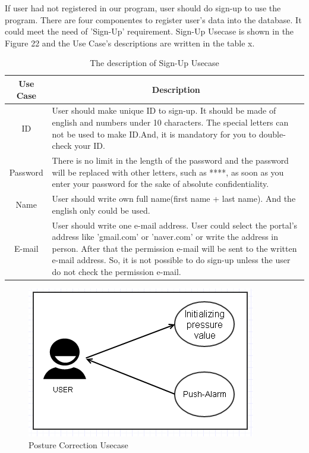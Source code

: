 \documentclass[conference]{IEEEtran}
\begin{document}
 
If user had not registered in our program, user should do sign-up to use the program. There are four componentes to register user's data into the database. It could meet the need of 'Sign-Up' requirement. Sign-Up Usecase is shown in the Figure 22 and the Use Case's descriptions are written in the table x.

\begin{table}[h]
{\renewcommand\arraystretch{1.25}
\caption{The description of Sign-Up Usecase}
\begin{tabular}{|c|l|l|} \hline
Use Case & \multicolumn{2}{c|}{Description} \\ \hline\hline
ID& \multicolumn{2}{p{6.75cm}|}{\raggedright User should make unique ID to sign-up. It should be made of english and numbers under 10 characters. The special letters can not be used to make ID.And, it is mandatory for you to double-check your ID.} \\ \hline
Password & \multicolumn{2}{p{6.75cm}|}{\raggedright There is  no limit in the length of the password and the password will be replaced with other letters, such as ****, as soon as you enter your password for the sake of absolute confidentiality.} \\ \hline
Name& \multicolumn{2}{p{6.75cm}|}{\raggedright User should write own full name(first name + last name). And the english only could be used.} \\ \hline
E-mail& \multicolumn{2}{p{6.75cm}|}{\raggedright User should write one e-mail address. User could select the portal's address like 'gmail.com' or 'naver.com' or write the address in person. After that the permission e-mail will be sent to the written e-mail address. So, it is not possible to do sign-up unless the user do not check the permission e-mail.} \\ \hline
\end{tabular}}
\end{table} 

\begin{figure}[htbp]
\begin{center}
    \includegraphics[scale=0.8]{img_20.png}
    \caption{Posture Correction Usecase} 
\end{center}
\end{figure}
 	  
\end{document}
